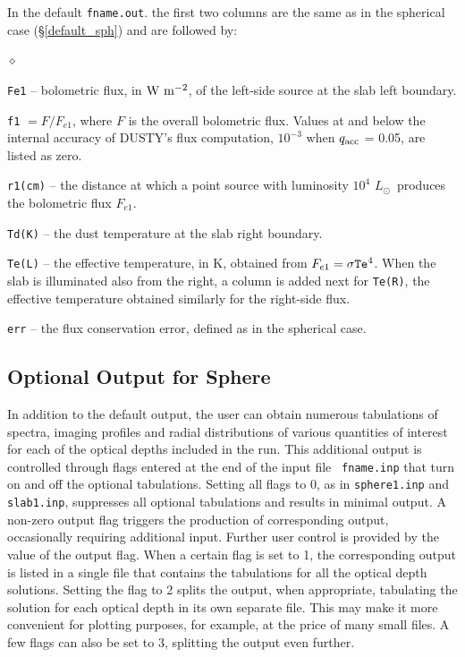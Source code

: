 \documentclass[11pt]{article}
\def\D  {{\sf DUSTY}}
\def\E#1{\hbox{$10^{#1}$}}
\def\Lo     {\hbox{$L_{\odot}$}}
\begin{document}
In the default {\tt fname.out}. the first two columns are the same as in the
spherical case (\S\ref{default_sph}) and are followed by:
\begin{list}{$\diamond$}{}
\item{\tt Fe1} -- bolometric flux, in $\rm W\ m^{-2}$, of the left-side source
    at the slab left boundary.
\item{\tt f1} $= F/F_{e1}$, where $F$ is the overall bolometric flux. Values at
    and below the internal accuracy of \D's flux computation, \E{-3} when
    $q_{\rm acc}$ = 0.05, are listed as zero.
\item{\tt r1(cm)} -- the distance at which a point source with luminosity \E4
    \Lo\ produces the bolometric flux $F_{e1}$.
\item  {\tt Td(K)} -- the dust temperature at the slab right boundary.
\item {\tt Te(L)} -- the effective temperature, in K, obtained from $F_{e1} =
    \sigma{\tt Te}^4$.  When the slab is illuminated also from the right, a
    column is added next for {\tt Te(R)}, the effective temperature obtained
    similarly for the right-side flux.
\item{\tt err} -- the flux conservation error, defined as in the spherical
    case.

\end{list}


\subsection{Optional Output for Sphere}
\label{OptionalOutput_sph}

In addition to the default output, the user can obtain numerous tabulations of
spectra, imaging profiles and radial distributions of various quantities of
interest for each of the optical depths included in the run. This additional
output is controlled through flags entered at the end of the input file {\tt
fname.inp} that turn on and off the optional tabulations.  Setting all flags to
0, as in {\tt sphere1.inp} and {\tt slab1.inp}, suppresses all optional
tabulations and results in minimal output. A non-zero output flag triggers the
production of corresponding output, occasionally requiring additional input.
Further user control is provided by the value of the output flag. When a
certain flag is set to 1, the corresponding output is listed in a single file
that contains the tabulations for all the optical depth solutions. Setting the
flag to 2 splits the output, when appropriate, tabulating the solution for each
optical depth in its own separate file. This may make it more convenient for
plotting purposes, for example, at the price of many small files.  A few flags
can also be set to 3, splitting the output even further.
\end{document}
